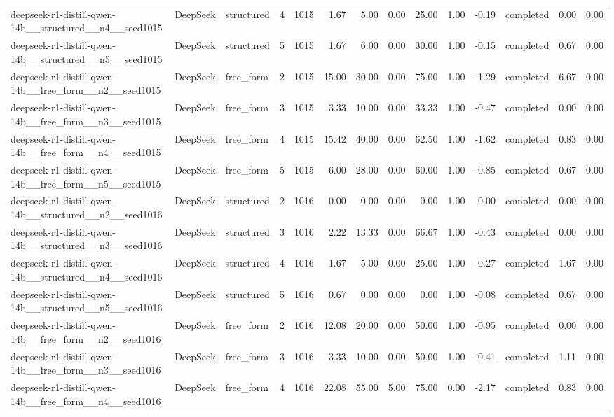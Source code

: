 \begin{longtable}{lllrrrrrrrrlrr}
deepseek-r1-distill-qwen-14b\_\_structured\_\_n4\_\_seed1015 & DeepSeek & structured & 4 & 1015 & 1.67 & 5.00 & 0.00 & 25.00 & 1.00 & -0.19 & completed & 0.00 & 0.00 \\
deepseek-r1-distill-qwen-14b\_\_structured\_\_n5\_\_seed1015 & DeepSeek & structured & 5 & 1015 & 1.67 & 6.00 & 0.00 & 30.00 & 1.00 & -0.15 & completed & 0.67 & 0.00 \\
deepseek-r1-distill-qwen-14b\_\_free\_form\_\_n2\_\_seed1015 & DeepSeek & free\_form & 2 & 1015 & 15.00 & 30.00 & 0.00 & 75.00 & 1.00 & -1.29 & completed & 6.67 & 0.00 \\
deepseek-r1-distill-qwen-14b\_\_free\_form\_\_n3\_\_seed1015 & DeepSeek & free\_form & 3 & 1015 & 3.33 & 10.00 & 0.00 & 33.33 & 1.00 & -0.47 & completed & 0.00 & 0.00 \\
deepseek-r1-distill-qwen-14b\_\_free\_form\_\_n4\_\_seed1015 & DeepSeek & free\_form & 4 & 1015 & 15.42 & 40.00 & 0.00 & 62.50 & 1.00 & -1.62 & completed & 0.83 & 0.00 \\
deepseek-r1-distill-qwen-14b\_\_free\_form\_\_n5\_\_seed1015 & DeepSeek & free\_form & 5 & 1015 & 6.00 & 28.00 & 0.00 & 60.00 & 1.00 & -0.85 & completed & 0.67 & 0.00 \\
deepseek-r1-distill-qwen-14b\_\_structured\_\_n2\_\_seed1016 & DeepSeek & structured & 2 & 1016 & 0.00 & 0.00 & 0.00 & 0.00 & 1.00 & 0.00 & completed & 0.00 & 0.00 \\
deepseek-r1-distill-qwen-14b\_\_structured\_\_n3\_\_seed1016 & DeepSeek & structured & 3 & 1016 & 2.22 & 13.33 & 0.00 & 66.67 & 1.00 & -0.43 & completed & 0.00 & 0.00 \\
deepseek-r1-distill-qwen-14b\_\_structured\_\_n4\_\_seed1016 & DeepSeek & structured & 4 & 1016 & 1.67 & 5.00 & 0.00 & 25.00 & 1.00 & -0.27 & completed & 1.67 & 0.00 \\
deepseek-r1-distill-qwen-14b\_\_structured\_\_n5\_\_seed1016 & DeepSeek & structured & 5 & 1016 & 0.67 & 0.00 & 0.00 & 0.00 & 1.00 & -0.08 & completed & 0.67 & 0.00 \\
deepseek-r1-distill-qwen-14b\_\_free\_form\_\_n2\_\_seed1016 & DeepSeek & free\_form & 2 & 1016 & 12.08 & 20.00 & 0.00 & 50.00 & 1.00 & -0.95 & completed & 0.00 & 0.00 \\
deepseek-r1-distill-qwen-14b\_\_free\_form\_\_n3\_\_seed1016 & DeepSeek & free\_form & 3 & 1016 & 3.33 & 10.00 & 0.00 & 50.00 & 1.00 & -0.41 & completed & 1.11 & 0.00 \\
deepseek-r1-distill-qwen-14b\_\_free\_form\_\_n4\_\_seed1016 & DeepSeek & free\_form & 4 & 1016 & 22.08 & 55.00 & 5.00 & 75.00 & 0.00 & -2.17 & completed & 0.83 & 0.00 \\

\end{longtable}
